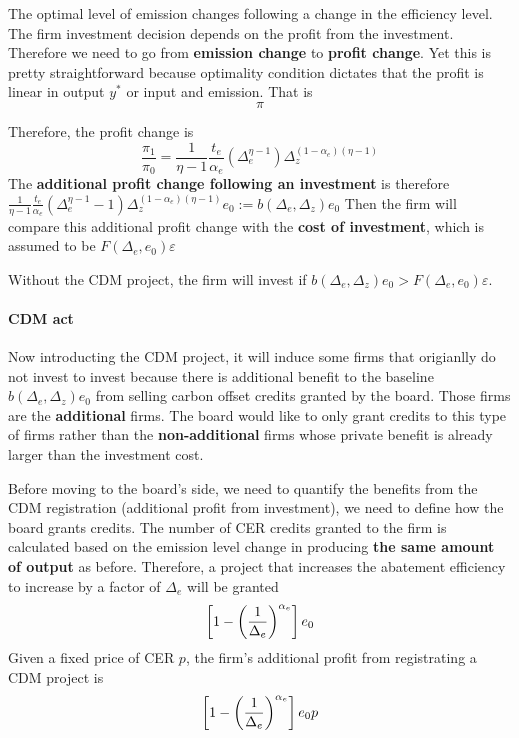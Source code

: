 \documentclass[12pt]{article}[margin=1in]
\begin{document}
The optimal level of emission changes following a change in the efficiency level. The firm investment decision depends on the profit from the investment. Therefore we need to go from \textbf{emission change} to \textbf{profit change}. Yet this is pretty straightforward because optimality condition dictates that the profit is linear in output $y^*$ or input and emission.
That is
\begin{equation}
    \pi
\end{equation}

Therefore, the profit change is
\begin{equation}
    \frac{\pi_1}{\pi_0}=\frac{1}{\eta-1}\frac{t_e}{\alpha_e}(\Delta_e^{\eta-1})\Delta_z^{(1-\alpha_e)(\eta-1)}
\end{equation}
The \textbf{additional profit change following an investment} is therefore $\frac{1}{\eta-1}\frac{t_e}{\alpha_e}(\Delta_e^{\eta-1}-1)\Delta_z^{(1-\alpha_e)(\eta-1)}e_0 := b(\Delta_e,\Delta_z)e_0$
Then the firm will compare this additional profit change with the \textbf{cost of investment}, which is assumed to be $F(\Delta_e,e_0) \varepsilon$

Without the CDM project, the firm will invest if $b(\Delta_e,\Delta_z)e_0 > F(\Delta_e,e_0) \varepsilon$.

\paragraph{CDM act}Now introducting the CDM project, it will induce some firms that origianlly do not invest to invest because there is additional benefit to the baseline $b(\Delta_e,\Delta_z)e_0$ from selling carbon offset credits granted by the board. Those firms are the \textbf{additional} firms. The board would like to only grant credits to this type of firms rather than the \textbf{non-additional} firms whose private benefit is already larger than the investment cost.

Before moving to the board's side, we need to quantify the benefits from the CDM registration (additional profit from investment), we need to define how the board grants credits. The number of CER credits granted to the firm is calculated based on the emission level change in producing \textbf{the same amount of output} as before. Therefore, a project that increases the abatement efficiency to increase by a factor of $\Delta_e$ will be granted
$$ \left[1-\left(\frac{1}{\Delta_e}\right)^{\alpha_e}\right] e_0$$
Given a fixed price of CER $p$, the firm's additional profit from registrating a CDM project is
\begin{equation}\label{eq:profit_cer}
    \left[1-\left(\frac{1}{\Delta_e}\right)^{\alpha_e}\right] e_0 p
\end{equation}
\end{document}
